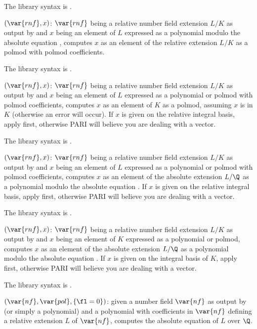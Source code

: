 The library syntax is .

$(\var{rnf},x)$: \label{se:rnfeltabstorel}$\var{rnf}$ being a relative
number field extension $L/K$ as output by  and $x$ being an
element of $L$ expressed as a polynomial modulo the absolute equation
, computes $x$ as an element of the relative extension
$L/K$ as a polmod with polmod coefficients.

The library syntax is .

$(\var{rnf},x)$: \label{se:rnfeltdown}$\var{rnf}$ being a relative number
field extension $L/K$ as output by  and $x$ being an element of
$L$ expressed as a polynomial or polmod with polmod coefficients, computes
$x$ as an element of $K$ as a polmod, assuming $x$ is in $K$ (otherwise an
error will occur). If $x$ is given on the relative integral basis, apply
 first, otherwise PARI will believe you are dealing with a
vector.

The library syntax is .

$(\var{rnf},x)$: \label{se:rnfeltreltoabs}$\var{rnf}$ being a relative
number field extension $L/K$ as output by  and $x$ being an
element of $L$ expressed as a polynomial or polmod with polmod
coefficients, computes $x$ as an element of the absolute extension $L/\Q$ as
a polynomial modulo the absolute equation . If $x$ is
given on the relative integral basis, apply  first,
otherwise PARI will believe you are dealing with a vector.

The library syntax is .

$(\var{rnf},x)$: \label{se:rnfeltup}$\var{rnf}$ being a relative number
field extension $L/K$ as output by  and $x$ being an element of
$K$ expressed as a polynomial or polmod, computes $x$ as an element of the
absolute extension $L/\Q$ as a polynomial modulo the absolute equation
. If $x$ is given on the integral basis of $K$, apply
 first, otherwise PARI will believe you are dealing with a
vector.

The library syntax is .

$(\var{nf},\var{pol},\{\fl=0\})$: \label{se:rnfequation}given a number field
$\var{nf}$ as output by  (or simply a polynomial) and a
polynomial  with coefficients in $\var{nf}$ defining a relative
extension $L$ of $\var{nf}$, computes the absolute equation of $L$ over
$\Q$.


